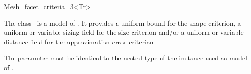 \ccRefPageBegin


\begin{ccRefFunctionObjectClass}{Mesh_facet_criteria_3<Tr>}  %


\ccDefinition
  
The class \ccRefName\ is a model of . 
It provides a uniform  bound for the shape criterion,
a uniform or variable sizing field
for the size criterion and/or 
a uniform or variable distance field
for the  approximation error criterion.




\ccParameters
The parameter  must be identical to the nested type
 of the instance used as model of
.


\end{ccRefFunctionObjectClass}
